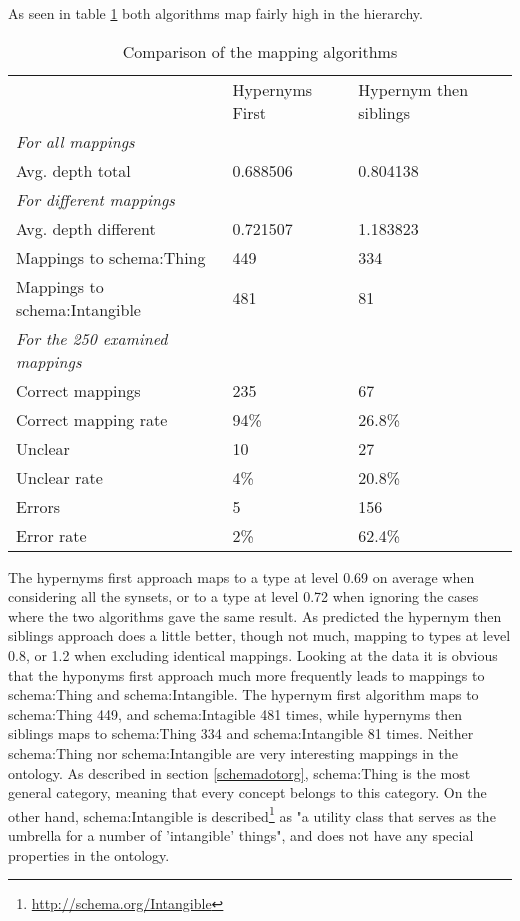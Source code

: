 As seen in table \ref{table:AlgorithmComparison} both algorithms map fairly high in the hierarchy.
\begin{table}[ht]
	\centering
	\begin{tabular}{lll}
											& Hypernyms First 	& Hypernym then siblings	\\
		\emph{For all mappings}				&					&							\\
		Avg. depth total					& 0.688506 			& 0.804138					\\[0.15cm]
		\emph{For different mappings}		&					&							\\
		Avg. depth different				& 0.721507			& 1.183823					\\
		Mappings to schema:Thing			& 449				& 334						\\
		Mappings to schema:Intangible		& 481				& 81						\\[0.15cm]
		\emph{For the 250 examined mappings}&					&							\\
		Correct mappings					& 235				& 67						\\
		Correct mapping	rate				& 94\%				& 26.8\%					\\
		Unclear								& 10				& 27						\\
		Unclear	rate						& 4\%				& 20.8\%					\\
		Errors								& 5 				& 156 						\\
		Error rate							& 2\%				& 62.4\%					\\
	\end{tabular}
	\caption{Comparison of the mapping algorithms}
	\label{table:AlgorithmComparison}
\end{table}
The hypernyms first approach maps to a type at level 0.69 on average when considering all the synsets,
or to a type at level 0.72 when ignoring the cases where the two algorithms gave the same result.
As predicted the hypernym then siblings approach does a little better, though not much,
mapping to types at level 0.8, or 1.2 when excluding identical mappings.
Looking at the data it is obvious that the hyponyms first approach much more frequently leads to mappings to schema:Thing and schema:Intangible.
The hypernym first algorithm maps to schema:Thing 449, and schema:Intagible 481 times,
while hypernyms then siblings maps to schema:Thing 334 and schema:Intangible 81 times.
Neither schema:Thing nor schema:Intangible are very interesting mappings in the ontology.
As described in section \ref{schemadotorg}, schema:Thing is the most general category, meaning that every concept belongs to this category.
On the other hand, schema:Intangible is described\footnote{\url{http://schema.org/Intangible}} as "a utility class that serves as the umbrella for a number of 'intangible' things",
and does not have any special properties in the ontology.

